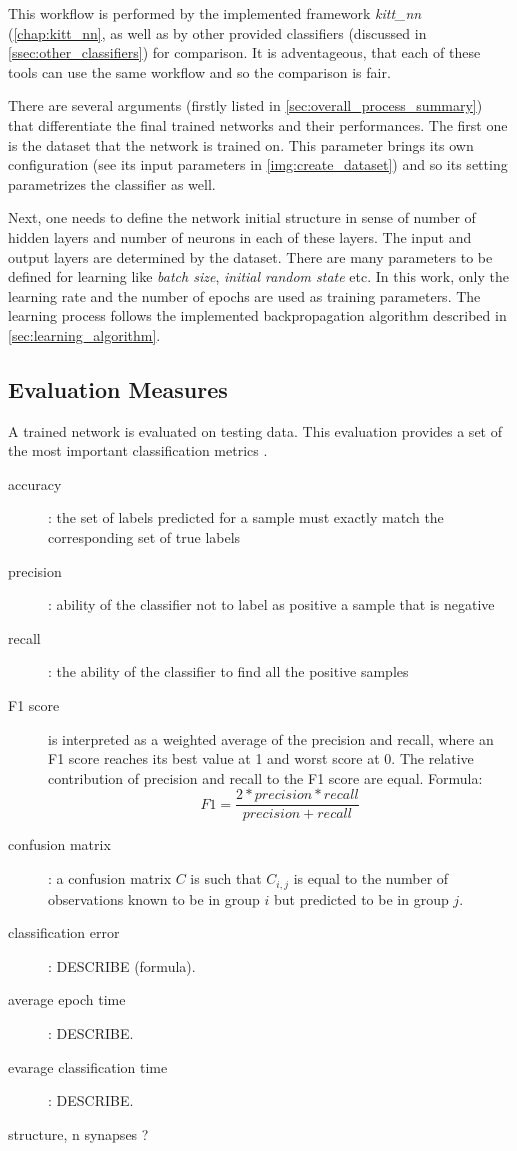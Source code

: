 This workflow is performed by the implemented framework \textit{kitt\_nn} (\cref{chap:kitt_nn}, as well as by other provided classifiers (discussed in \cref{ssec:other_classifiers}) for comparison. It is adventageous, that each of these tools can use the same workflow and so the comparison is fair.

There are several arguments (firstly listed in \cref{sec:overall_process_summary}) that differentiate the final trained networks and their performances. The first one is the dataset that the network is trained on. This parameter brings its own configuration (see its input parameters in \cref{img:create_dataset}) and so its setting parametrizes the classifier as well.

Next, one needs to define the network initial structure in sense of number of hidden layers and number of neurons in each of these layers. The input and output layers are determined by the dataset. There are many parameters to be defined for learning like \textit{batch size}, \textit{initial random state} etc. In this work, only the learning rate and the number of epochs are used as training parameters. The learning process follows the implemented backpropagation algorithm described in \cref{sec:learning_algorithm}.

\subsection{Evaluation Measures} \label{ssec:evaluation_measures}
A trained network is evaluated on testing data. This evaluation provides a set of the most important classification metrics \citep{article:scikit-learn}.

\begin{description}
\item[accuracy] : the set of labels predicted for a sample must exactly match the corresponding set of true labels
\item[precision] : ability of the classifier not to label as positive a sample that is negative
\item[recall] : the ability of the classifier to find all the positive samples
\item[F1 score] is interpreted as a weighted average of the precision and recall, where an F1 score reaches its best value at 1 and worst score at 0. The relative contribution of precision and recall to the F1 score are equal. Formula:
\begin{equation} \label{eq:f1_score}
F1 = \frac{2 * precision * recall}{precision + recall}
\end{equation}
\item[confusion matrix] : a confusion matrix $ C $ is such that $ C_{i, j} $ is equal to the number of observations known to be in group $ i $ but predicted to be in group $ j $.
\item[classification error] : DESCRIBE (formula).
\item[average epoch time] : DESCRIBE.
\item[evarage classification time] : DESCRIBE.
\end{description}

structure, n synapses ?